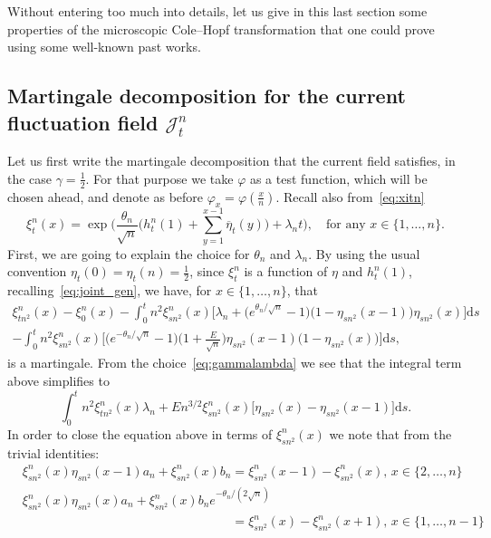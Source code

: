 \documentclass[AHL,Unicode,longabstracts]{cedram}
\newcommand{\mc}[1]{{\mathcal #1}}
\renewcommand{\mc}[1]{{\mathcal #1}}
\renewcommand{\bar}{\overline}
\newcommand*{\dd}{\mathrm{d}}
\newcommand*{\ds}{\dd s}
\renewcommand{\tfrac}{\frac}
\begin{document}
Without entering too much into details, let us give in this last section some properties of the microscopic Cole--Hopf transformation that one could prove using some well-known past works.

\subsection{Martingale decomposition for the current fluctuation field \texorpdfstring{$\mc J_t^n$}{Jtn}} \label{sec:appCH}

Let us first write the martingale decomposition that the current field satisfies, in the case $\gamma=\frac12$. For that purpose we take $\varphi$ as a test function, which will be chosen ahead, and denote as before $\varphi_x=\varphi(\frac x n)$. Recall also from~\eqref{eq:xitn}
\[
\xi_t^n(x) = \exp\bigg(\frac{\theta_n}{\sqrt n} \bigg(h_t^n(1) + \sum_{y=1}^{x-1} \bar\eta_{t}(y)\bigg)+\lambda_n t \bigg), \quad \text{for any } x \in \{1,\dots,n\}.
\]
First, we are going to explain the choice for $\theta_n$ and $\lambda_n$. By using the usual convention $\eta_{t}(0)=\eta_{t}(n)=\frac12$, since $\xi_t^n$ is a function of $\eta$ and $h_t^n(1)$, recalling~\eqref{eq:joint_gen}, we have, for $x \in \{1,\dots,n\}$, that
\begin{multline*}
\xi_{{tn^2}}^n(x) -\xi_{{0}}^n(x)-\int_0^t n^2\xi_{{sn^2}}^n(x)\Big[\lambda_n + \big(e^{\theta_n/\sqrt n}-1\big)\big(1-\eta_{sn^2}(x-1)\big)\eta_{sn^2}(x) \Big]\ds\\
- \int_0^t n^2\xi_{{sn^2}}^n(x)\bigg[\big(e^{-\theta_n/\sqrt n}-1\big)\bigg(1+\tfrac{E}{\sqrt n}\bigg)\eta_{sn^2}(x-1)\big(1-\eta_{sn^2}(x)\big)\bigg]\ds,
\end{multline*}
is a martingale. From the choice~\eqref{eq:gammalambda} we see that the integral term above simplifies to
\begin{equation}\label{eq:mart_dec_CH}
\int_0^t n^2\xi_{{tn^2}}^n(x) \lambda_n+En^{3/2}\xi_{{sn^2}}^n(x)\big[\eta_{sn^2}(x)-\eta_{sn^2}(x-1)\big] \ds.
\end{equation}
In order to close the equation above in terms of $\xi_{{sn^2}}^n(x)$ we note that from the trivial identities:
\begin{equation}\label{eq:trivial_id}
\begin{split}
&\xi_{{sn^2}}^n(x)\eta_{sn^2}(x-1)a_n+\xi_{{sn^2}}^n(x){b_n}=\xi_{{sn^2}}^n(x-1)-\xi_{{sn^2}}^n(x),\, x \in \{2,\dots, n\}\\[0.5em]
&\xi_{sn^2}^n(x)\eta_{sn^2}(x)a_n+\xi_{{sn^2}}^n(x){b_ne^{-\theta_n/(2\sqrt n)}}\\[-0.5em]
&\phantom{\xi_{{sn^2}}^n(x)\eta_{sn^2}(x-1)a_n+\xi_{{sn^2}}^n(x){b_n}}=\xi_{{sn^2}}^n(x)-\xi_{{sn^2}}^n(x+1), \, x \in \{1,\dots, n-1\}
\end{split}
\end{equation}
\end{document}
